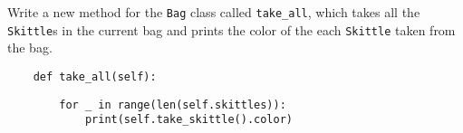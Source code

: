 \question Write a new method for the \texttt{Bag} class called {\tt take\_all},
which takes all the \texttt{Skittle}s in the current bag and prints the color of
the each \texttt{Skittle} taken from the bag.
\begin{lstlisting}
    def take_all(self):
\end{lstlisting}
\begin{solution}[2.5 in]
\begin{lstlisting}
        for _ in range(len(self.skittles)):
            print(self.take_skittle().color)
\end{lstlisting}
\end{solution}
